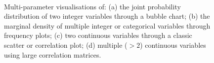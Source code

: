 \documentclass{bioinfo_tracer}
\begin{document}
%
\begin{figure}[t]
 \\
\vspace{-0.25cm}
\caption{Multi-parameter visualisations of: (a) the joint probability distribution of two integer variables through a bubble chart; (b) the marginal density of multiple integer or categorical variables through frequency plots; (c) two continuous variables through a classic scatter or correlation plot; (d) multiple ($> 2$) continuous variables using large correlation matrices.
}
\label{fig:4tabs}
\end{figure}
%
\end{document}
